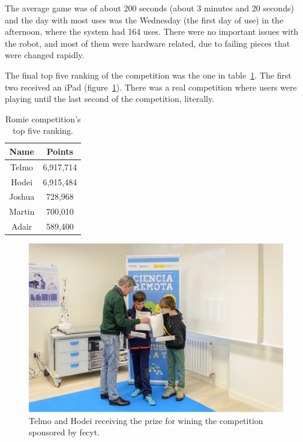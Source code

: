 The average game was of about 200 seconds (about 3 minutes and 20 seconds) and the day with most
uses was the Wednesday (the first day of use) in the afternoon, where the system had 164 uses. There
were no important issues with the robot, and most of them were hardware related, due to failing
pieces that were changed rapidly.

The final top five ranking of the competition was the one in table~\ref{tab:ranking}. The first two
received an iPad (figure~\ref{fig:prizes}). There was a real competition where users were playing
until the last second of the competition, literally.

\begin{table}[ht]
	\centering
	\caption{Romie competition's top five ranking.}\label{tab:ranking}
	\begin{tabular}{cc}
		\toprule
		\textbf{Name} & \textbf{Points} \\
		\midrule
		Telmo		& 6,917,714	\\
		Hodei		& 6,915,484	\\
		Joshua		& 728,968	\\
		Martin		& 700,010	\\
		Adair		& 589,400	\\
		\bottomrule
	\end{tabular}
\end{table}

\begin{figure}[ht]
	\centering
	\includegraphics[height=0.3\textheight]{fig/prizes.jpg}
	\caption{Telmo and Hodei receiving the prize for wining the competition sponsored by \acrshort{fecyt}.}
	\label{fig:prizes}
\end{figure}

